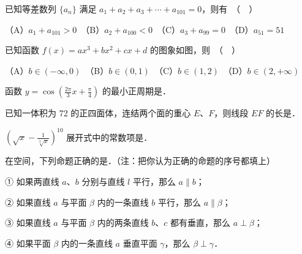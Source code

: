 \begin{question}
已知等差数列 $\{a_n\}$ 满足 $a_1 + a_2 + a_3 + \cdots + a_{101} = 0$，则有　（　）

（A）$a_1 + a_{101} > 0$　（B）$a_2 + a_{100} < 0$　（C）$a_3 + a_{99} = 0$　（D）$a_{51} = 51$

\Needspace{0.4\textheight}
\end{question}
\begin{question}
已知函数 $f(x) = ax^3 + bx^2 + cx + d$ 的图象如图，则　（　）
\nopagebreak[4]
\begin{center}\end{center}
\nopagebreak[4]
（A）$b \in (-\infty, 0)$　（B）$b \in (0, 1)$　（C）$b \in (1, 2)$　（D）$b \in (2, +\infty)$

\end{question}

\begin{question}
函数 $y = \cos\left(\frac{2\pi}{3}x + \frac{\pi}{4}\right)$ 的最小正周期是\gkblank{}．

\end{question}
\begin{question}
已知一体积为 72 的正四面体，连结两个面的重心 $E$、$F$，则线段 $EF$ 的长是\gkblank{}．

\end{question}
\begin{question}
$\left(\sqrt{x} - \frac{1}{\sqrt[3]{x}}\right)^{10}$ 展开式中的常数项是\gkblank{}．

\end{question}
\begin{question}
在空间，下列命题正确的是\gkblank{}．（注：把你认为正确的命题的序号都填上）

① 如果两直线 $a$、$b$ 分别与直线 $l$ 平行，那么 $a \parallel b$；

② 如果直线 $a$ 与平面 $\beta$ 内的一条直线 $b$ 平行，那么 $a \parallel \beta$；

③ 如果直线 $a$ 与平面 $\beta$ 内的两条直线 $b$、$c$ 都有垂直，那么 $a \perp \beta$；

④ 如果平面 $\beta$ 内的一条直线 $a$ 垂直平面 $\gamma$，那么 $\beta \perp \gamma$．

\end{question}

